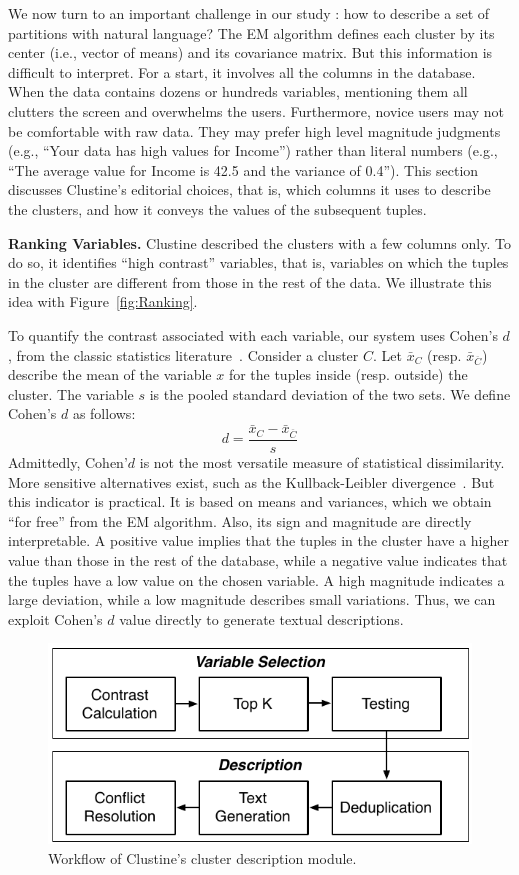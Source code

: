 We now turn to an important challenge in our study : how to describe a set of
partitions with natural language? The EM algorithm defines each cluster by
its center (i.e., vector of means) and its covariance matrix.  But this
information is difficult to interpret. For a start, it involves all the columns
in the database. When the data contains dozens or hundreds variables,
mentioning them all clutters the screen and overwhelms the users.
Furthermore, novice users may not be comfortable with raw data.  They may
prefer high level magnitude judgments (e.g., ``Your data has high values for
Income'') rather than literal numbers  (e.g., ``The average value for Income is
42.5 and the variance of 0.4''). This section discusses Clustine's editorial
choices, that is, which columns it uses to describe the clusters, and how it
conveys the values of the subsequent tuples.

\textbf{Ranking Variables.} Clustine described the clusters with a few columns
only. To do so, it identifies ``high contrast'' variables, that is, variables
on which the tuples in the cluster are different from those in the rest of the
data. We illustrate this idea with Figure~\ref{fig:Ranking}.  

To quantify the
contrast associated with each variable, our system uses Cohen's $d$, from the
classic statistics literature~\cite{cohen1977statistical}. Consider a cluster
$C$. Let $\bar{x}_C$ (resp.  $\bar{x}_{\overline{C}}$) describe the mean of the
variable $x$ for the tuples inside (resp. outside)  the cluster. The variable
$s$ is the pooled standard deviation of the two sets. We define Cohen's $d$ as
follows:
$$
d = \frac{\bar{x}_C -\bar{x}_{\overline{C}}}{s}
$$
Admittedly, Cohen'$d$ is not the most versatile measure of statistical
dissimilarity. More sensitive alternatives exist, such as the Kullback-Leibler
divergence~\cite{bishop2001bishop}.  But this indicator is practical.
It is based on means and variances, which we obtain ``for free''
from the EM algorithm. Also, its sign and magnitude are directly interpretable. A
positive value implies that the tuples in the cluster have a higher value than
those in the rest of the database, while a negative value indicates that the
tuples have a low value on the chosen variable. A high magnitude indicates a
large deviation, while a low magnitude describes small variations. Thus,
we can exploit Cohen's $d$ value directly to generate textual descriptions.

\begin{figure}[t!]
  \centering
  \includegraphics[width=.8\columnwidth]{Explanations}
  \caption{Workflow of Clustine's cluster description module.}
  \label{fig:descriptions}
\end{figure}

